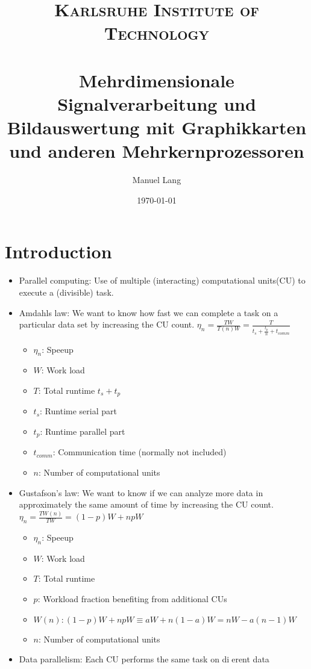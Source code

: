 \documentclass[paper=a4, fontsize=11pt]{scrartcl} %
\title{
\normalfont \normalsize
\textsc{Karlsruhe Institute of Technology} \\ [25pt] %
\horrule{0.5pt} \\[0.4cm] %
\huge Mehrdimensionale Signalverarbeitung und Bildauswertung mit Graphikkarten und anderen Mehrkernprozessoren %
\horrule{2pt} \\[0.5cm] %
}
\author{Manuel Lang} %
\date{\normalsize\today} %
\numberwithin{equation}{section} %
\numberwithin{figure}{section} %
\numberwithin{table}{section} %
\begin{document}
\maketitle %
\newpage
\tableofcontents
\newpage

\section{Introduction}

\begin{itemize}
  \item Parallel computing: Use of multiple (interacting) computational units(CU) to execute a (divisible) task.
  \item Amdahls law: We want to know how fast we can complete a task on a particular data set by increasing the CU count. $\eta_n = \frac{TW}{T(n)W} = \frac{T}{t_s + \frac{t_p}{n} + t_{comm}}$
  \begin{itemize}
    \item $\eta_n$: Speeup
    \item $W$: Work load
    \item $T$: Total runtime $t_s + t_p$
    \item $t_s$: Runtime serial part
    \item $t_p$: Runtime parallel part
    \item $t_{comm}$: Communication time (normally not included)
    \item $n$: Number of computational units
  \end{itemize}
  \item Gustafson's law: We want to know if we can analyze more data in approximately the same amount of time by increasing the CU count. $\eta_n = \frac{TW(n)}{TW} = (1-p)W + npW$
  \begin{itemize}
    \item $\eta_n$: Speeup
    \item $W$: Work load
    \item $T$: Total runtime
    \item $p$: Workload fraction benefiting from additional CUs
    \item $W(n): (1-p)W + np W \equiv aW + n(1-a)W = nW - a(n-1)W$
    \item $n$: Number of computational units
  \end{itemize}
  \item Data parallelism: Each CU performs the same task on dierent data
  \begin{itemize}

\end{itemize}
\end{itemize}
\end{document}
